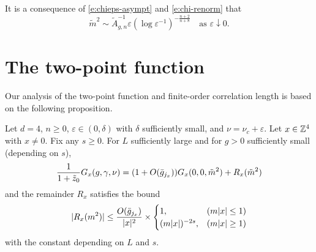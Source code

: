 \begin{rk}
It is a consequence of \eqref{e:chieps-asympt} and \eqref{e:chi-renorm} that
\begin{equation}
\label{e:mass-epsilon-asympt}
\tilde m^2
	\sim
\tilde A_{g,n}^{-1} \varepsilon (\log \varepsilon^{-1})^{-\frac{n + 2}{n + 8}}
	\quad
\text{as $\varepsilon \downarrow 0$}.
\end{equation}
\end{rk}


\section{The two-point function}

Our analysis of the two-point function and finite-order correlation length is
based on the following proposition.

\begin{prop}
\label{prop:R}
Let $d=4$, $n \ge 0$, $\varepsilon \in (0,\delta)$ with $\delta$ sufficiently small,
and $\nu = \nu_c + \varepsilon$.
Let $x \in {\mathbb Z}^4$ with $x \neq 0$.
Fix any $s \geq 0$.
For $L$ sufficiently large and for $g > 0$ sufficiently small (depending on $s$),
\begin{equation}
\label{e:Gab-to-sum-Rqj}
\frac{1}{1+\tilde z_0} G_x(g, \gamma, \nu)
	=
(1 + O(\bar{g}_{j_x})) G_x(0, 0, \tilde m^2) + R_x(\tilde m^2)
\end{equation}
and the remainder $R_x$ satisfies the bound
\begin{equation}
\label{e:Rab-bound}
|R_{x}(m^2)|
	\le
\frac{O(\bar{g}_{j_{x}}) }{|x|^2}
	\times
\begin{cases}
1,				& (m|x|\le 1) \\
(m|x|)^{-2s},	& (m|x|\ge 1)
\end{cases}
\end{equation}
with the  constant depending on $L$ and $s$.
\end{prop}

